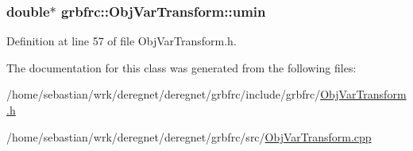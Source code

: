 \subsubsection[{\texorpdfstring{umin}{umin}}]{\setlength{\rightskip}{0pt plus 5cm}double$\ast$ grbfrc\+::\+Obj\+Var\+Transform\+::umin\hspace{0.3cm}{\ttfamily [private]}}\hypertarget{classgrbfrc_1_1ObjVarTransform_a802dc63945284b97ea3b2da08b29f0b1}{}\label{classgrbfrc_1_1ObjVarTransform_a802dc63945284b97ea3b2da08b29f0b1}


Definition at line 57 of file Obj\+Var\+Transform.\+h.



The documentation for this class was generated from the following files\+:\begin{DoxyCompactItemize}
\item 
/home/sebastian/wrk/deregnet/deregnet/grbfrc/include/grbfrc/\hyperlink{ObjVarTransform_8h}{Obj\+Var\+Transform.\+h}\item 
/home/sebastian/wrk/deregnet/deregnet/grbfrc/src/\hyperlink{ObjVarTransform_8cpp}{Obj\+Var\+Transform.\+cpp}\end{DoxyCompactItemize}

